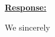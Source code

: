 \documentclass[a4paper,12pt]{article}
\begin{document}
\noindent \underline {\textbf{Response:}}
\bigskip

We sincerely
\end{document}
